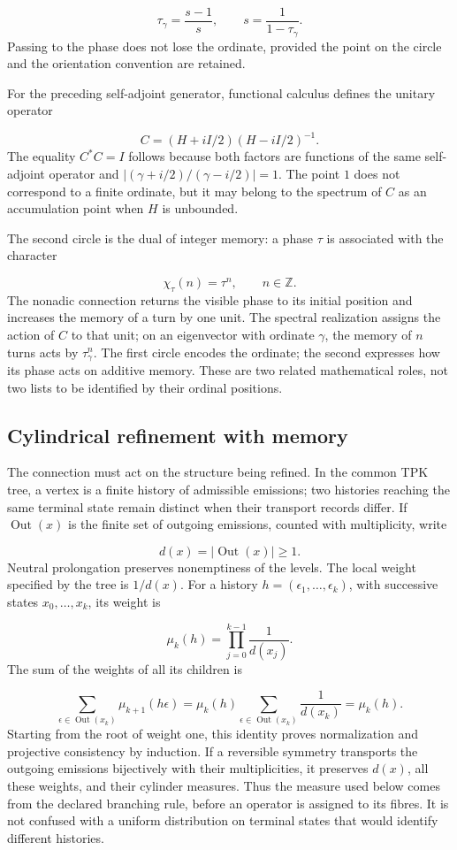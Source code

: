 \[
\tau_\gamma=\frac{s-1}{s},\qquad s=\frac1{1-\tau_\gamma}.
\]
Passing to the phase does not lose the ordinate, provided the point on the circle and the orientation convention are retained.

For the preceding self-adjoint generator, functional calculus defines the unitary operator

\[
C=(H+iI/2)(H-iI/2)^{-1}.
\]
The equality \(C^*C=I\) follows because both factors are functions of the same self-adjoint operator and \(|(\gamma+i/2)/(\gamma-i/2)|=1\). The point \(1\) does not correspond to a finite ordinate, but it may belong to the spectrum of \(C\) as an accumulation point when \(H\) is unbounded.

The second circle is the dual of integer memory: a phase \(\tau\) is associated with the character

\[
\chi_\tau(n)=\tau^n,\qquad n\in\mathbb Z.
\]
The nonadic connection returns the visible phase to its initial position and increases the memory of a turn by one unit. The spectral realization assigns the action of \(C\) to that unit; on an eigenvector with ordinate \(\gamma\), the memory of \(n\) turns acts by \(\tau_\gamma^n\). The first circle encodes the ordinate; the second expresses how its phase acts on additive memory. These are two related mathematical roles, not two lists to be identified by their ordinal positions.

\subsection{Cylindrical refinement with memory}
\label{viii:rz:refinamiento}
The connection must act on the structure being refined. In the common TPK tree, a vertex is a finite history of admissible emissions; two histories reaching the same terminal state remain distinct when their transport records differ. If \(\operatorname{Out}(x)\) is the finite set of outgoing emissions, counted with multiplicity, write

\[
d(x)=|\operatorname{Out}(x)|\geq1.
\]
Neutral prolongation preserves nonemptiness of the levels. The local weight specified by the tree is \(1/d(x)\). For a history \(h=(\epsilon_1,\ldots,\epsilon_k)\), with successive states \(x_0,\ldots,x_k\), its weight is

\[
\mu_k(h)=\prod_{j=0}^{k-1}\frac1{d(x_j)}.
\]
The sum of the weights of all its children is

\[
\sum_{\epsilon\in\operatorname{Out}(x_k)}
\mu_{k+1}(h\epsilon)
=\mu_k(h)\sum_{\epsilon\in\operatorname{Out}(x_k)}\frac1{d(x_k)}
=\mu_k(h).
\]
Starting from the root of weight one, this identity proves normalization and projective consistency by induction. If a reversible symmetry transports the outgoing emissions bijectively with their multiplicities, it preserves \(d(x)\), all these weights, and their cylinder measures. Thus the measure used below comes from the declared branching rule, before an operator is assigned to its fibres. It is not confused with a uniform distribution on terminal states that would identify different histories.

